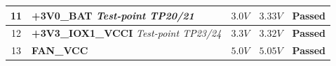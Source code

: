 \begin{longtable}{|c|p{5cm}|p{4.5cm}|p{2.5cm}|c|}
            11 & \textbf{+3V0\_BAT} \newline \textit{Test-point TP20/21} & $3.0 V$ & $3.33 V$ & \textcolor{modern_blue}{\textbf{Passed}} \\ \hline
            
            12 & \textbf{+3V3\_IOX1\_VCCI} \newline \textit{Test-point TP23/24} & $3.3 V$ & $3.32 V$ & \textcolor{modern_blue}{\textbf{Passed}} \\ \hline
            
            13 & \textbf{FAN\_VCC} & $5.0 V$ & $5.05 V$ & \textcolor{modern_blue}{\textbf{Passed}} \\ \hline

        \end{longtable}
